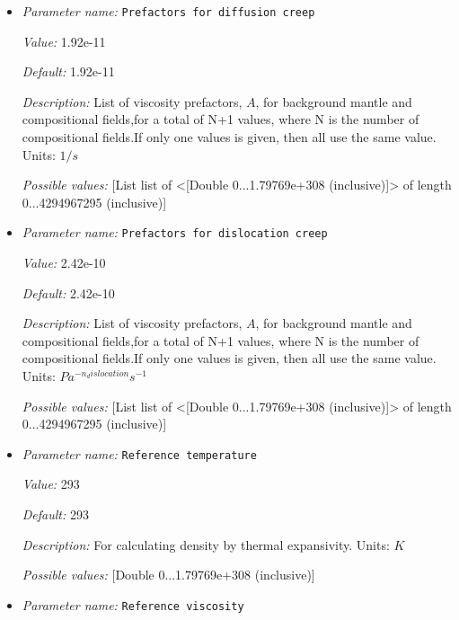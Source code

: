 \begin{itemize}
{\it Possible values:} [Double 0...1.79769e+308 (inclusive)]
\item {\it Parameter name:} {\tt Prefactors for diffusion creep}
\label{parameters:Material model/DiffusionDislocation/Prefactors for diffusion creep}


{\it Value:} 1.92e-11


{\it Default:} 1.92e-11


{\it Description:} List of viscosity prefactors, $A$, for background mantle and compositional fields,for a total of N+1 values, where N is the number of compositional fields.If only one values is given, then all use the same value.  Units: $1 / s$


{\it Possible values:} [List list of <[Double 0...1.79769e+308 (inclusive)]> of length 0...4294967295 (inclusive)]
\item {\it Parameter name:} {\tt Prefactors for dislocation creep}
\label{parameters:Material model/DiffusionDislocation/Prefactors for dislocation creep}


{\it Value:} 2.42e-10


{\it Default:} 2.42e-10


{\it Description:} List of viscosity prefactors, $A$, for background mantle and compositional fields,for a total of N+1 values, where N is the number of compositional fields.If only one values is given, then all use the same value.  Units: $Pa^{-n_dislocation} s^{-1}$


{\it Possible values:} [List list of <[Double 0...1.79769e+308 (inclusive)]> of length 0...4294967295 (inclusive)]
\item {\it Parameter name:} {\tt Reference temperature}
\label{parameters:Material model/DiffusionDislocation/Reference temperature}


{\it Value:} 293


{\it Default:} 293


{\it Description:} For calculating density by thermal expansivity. Units: $K$


{\it Possible values:} [Double 0...1.79769e+308 (inclusive)]
\item {\it Parameter name:} {\tt Reference viscosity}
\label{parameters:Material model/DiffusionDislocation/Reference viscosity}



\end{itemize}
